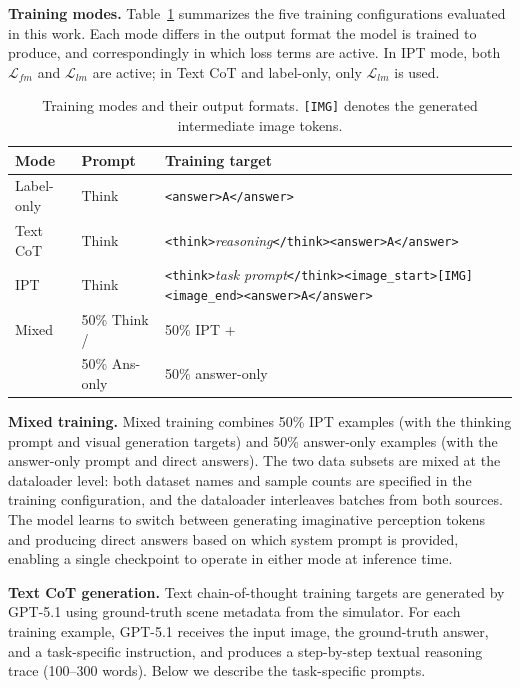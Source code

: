 \documentclass{llmxive}
\begin{document}
\noindent\textbf{Training modes.}
Table~\ref{tab:supp_modes} summarizes the five training configurations evaluated in this work.
Each mode differs in the output format the model is trained to produce, and correspondingly in which loss terms are active.
In IPT mode, both $\mathcal{L}_{fm}$ and $\mathcal{L}_{lm}$ are active; in Text CoT and label-only, only $\mathcal{L}_{lm}$ is used.

\begin{table}[h]
\centering
\footnotesize
\setlength{\tabcolsep}{4pt}
\begin{tabular}{llp{5.8cm}}
\toprule
\textbf{Mode} & \textbf{Prompt} & \textbf{Training target} \\
\midrule
Label-only & Think & \texttt{<answer>A</answer>} \\
Text CoT & Think & \texttt{<think>}\textit{reasoning}\texttt{</think>}\newline\texttt{<answer>A</answer>} \\
IPT & Think & \texttt{<think>}\textit{task prompt}\texttt{</think>}\newline\texttt{<image\_start>[IMG]<image\_end>}\newline\texttt{<answer>A</answer>} \\
\midrule
Mixed & 50\% Think / & 50\% IPT + \\
       & 50\% Ans-only & 50\% answer-only \\
\bottomrule
\end{tabular}
\caption{Training modes and their output formats. \texttt{[IMG]} denotes the generated intermediate image tokens.}
\label{tab:supp_modes}
\end{table}

\noindent\textbf{Mixed training.}
Mixed training combines 50\% IPT examples (with the thinking prompt and visual generation targets) and 50\% answer-only examples (with the answer-only prompt and direct answers).
The two data subsets are mixed at the dataloader level: both dataset names and sample counts are specified in the training configuration, and the dataloader interleaves batches from both sources.
The model learns to switch between generating imaginative perception tokens and producing direct answers based on which system prompt is provided, enabling a single checkpoint to operate in either mode at inference time.

\noindent\textbf{Text CoT generation.}
Text chain-of-thought training targets are generated by GPT-5.1 using ground-truth scene metadata from the simulator.
For each training example, GPT-5.1 receives the input image, the ground-truth answer, and a task-specific instruction, and produces a step-by-step textual reasoning trace (100--300 words).
Below we describe the task-specific prompts.
\end{document}

